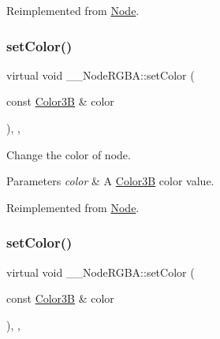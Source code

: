 Reimplemented from \hyperlink{classNode_a56b08f1d19bb0345f6fb40d9a3e3b4a4}{Node}.

\mbox{\label{class____NodeRGBA_adaec184f0ee740557ffddaece7ece996}} 
\subsubsection{\texorpdfstring{set\+Color()}{setColor()}\hspace{0.1cm}{\footnotesize\ttfamily [1/2]}}
{\footnotesize\ttfamily virtual void \+\_\+\+\_\+\+Node\+R\+G\+B\+A\+::set\+Color (\begin{DoxyParamCaption}\item[{const \hyperlink{structColor3B}{Color3B} \&}]{color }\end{DoxyParamCaption})\hspace{0.3cm}{\ttfamily [inline]}, {\ttfamily [override]}, {\ttfamily [virtual]}}

Change the color of node. 
\begin{DoxyParams}{Parameters}
{\em color} & A \hyperlink{structColor3B}{Color3B} color value. \\
\hline
\end{DoxyParams}


Reimplemented from \hyperlink{classNode_af45037de5b13602263b1ce51b50cafdd}{Node}.

\mbox{\label{class____NodeRGBA_adaec184f0ee740557ffddaece7ece996}} 
\subsubsection{\texorpdfstring{set\+Color()}{setColor()}\hspace{0.1cm}{\footnotesize\ttfamily [2/2]}}
{\footnotesize\ttfamily virtual void \+\_\+\+\_\+\+Node\+R\+G\+B\+A\+::set\+Color (\begin{DoxyParamCaption}\item[{const \hyperlink{structColor3B}{Color3B} \&}]{color }\end{DoxyParamCaption})\hspace{0.3cm}{\ttfamily [inline]}, {\ttfamily [override]}, {\ttfamily [virtual]}}

